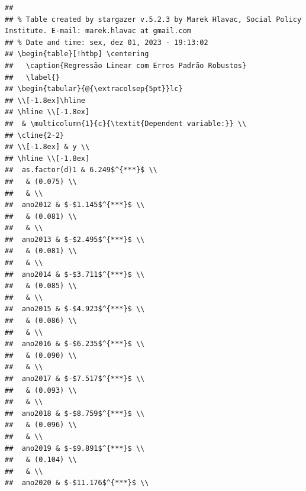\documentclass[
]{article}
\begin{document}
\begin{verbatim}
## 
## % Table created by stargazer v.5.2.3 by Marek Hlavac, Social Policy Institute. E-mail: marek.hlavac at gmail.com
## % Date and time: sex, dez 01, 2023 - 19:13:02
## \begin{table}[!htbp] \centering 
##   \caption{Regressão Linear com Erros Padrão Robustos} 
##   \label{} 
## \begin{tabular}{@{\extracolsep{5pt}}lc} 
## \\[-1.8ex]\hline 
## \hline \\[-1.8ex] 
##  & \multicolumn{1}{c}{\textit{Dependent variable:}} \\ 
## \cline{2-2} 
## \\[-1.8ex] & y \\ 
## \hline \\[-1.8ex] 
##  as.factor(d)1 & 6.249$^{***}$ \\ 
##   & (0.075) \\ 
##   & \\ 
##  ano2012 & $-$1.145$^{***}$ \\ 
##   & (0.081) \\ 
##   & \\ 
##  ano2013 & $-$2.495$^{***}$ \\ 
##   & (0.081) \\ 
##   & \\ 
##  ano2014 & $-$3.711$^{***}$ \\ 
##   & (0.085) \\ 
##   & \\ 
##  ano2015 & $-$4.923$^{***}$ \\ 
##   & (0.086) \\ 
##   & \\ 
##  ano2016 & $-$6.235$^{***}$ \\ 
##   & (0.090) \\ 
##   & \\ 
##  ano2017 & $-$7.517$^{***}$ \\ 
##   & (0.093) \\ 
##   & \\ 
##  ano2018 & $-$8.759$^{***}$ \\ 
##   & (0.096) \\ 
##   & \\ 
##  ano2019 & $-$9.891$^{***}$ \\ 
##   & (0.104) \\ 
##   & \\ 
##  ano2020 & $-$11.176$^{***}$ \\ 

\end{verbatim}
\end{document}
